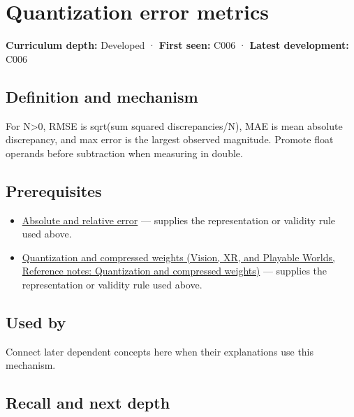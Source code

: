 \hypertarget{appendix-537171d69d27}{}\label{referencestart:appendix-537171d69d27}
\section{Quantization error metrics}\label{appendix-537171d69d27-quantization-error-metrics}

\textbf{Curriculum depth:} Developed · \textbf{First seen:} C006 · \textbf{Latest development:} C006

\begin{allmightroledefinition}

\subsection{Definition and mechanism}\label{appendix-537171d69d27-definition-and-mechanism}

For N\textgreater0, RMSE is sqrt(sum squared discrepancies/N), MAE is mean absolute discrepancy, and max error is the largest observed magnitude. Promote float operands before subtraction when measuring in double.

\end{allmightroledefinition}

\subsection{Prerequisites}\label{appendix-537171d69d27-prerequisites}

\begin{itemize}
\tightlist
\item
  \hyperref[appendix-3ae74e89b4e6]{Absolute and relative error} --- supplies the representation or validity rule used above.
\item
  \href{../07-Vision-XR-and-Playable-Worlds/main.pdf\#nameddest=appendix-fdc7879e8bf2}{Quantization and compressed weights (Vision, XR, and Playable Worlds, Reference notes: Quantization and compressed weights)} --- supplies the representation or validity rule used above.
\end{itemize}

\subsection{Used by}\label{appendix-537171d69d27-used-by}

Connect later dependent concepts here when their explanations use this mechanism.

\subsection{Recall and next depth}\label{appendix-537171d69d27-recall-and-next-depth}

